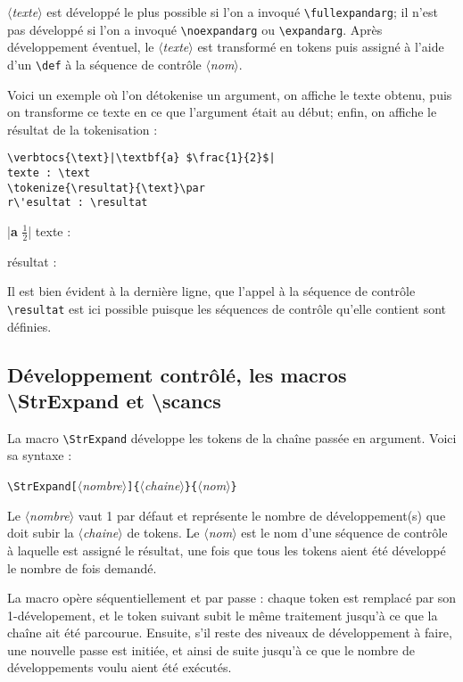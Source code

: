 \documentclass[a4paper,10pt]{article}
\newcommand\argu[1]{$\langle$\textit{#1}$\rangle$}
\newcommand\ARGU[1]{\texttt{\color{black}\{}\argu{#1}\texttt{\color{black}\}}}
\newcommand\arguC[1]{\texttt{\color{black}[}\argu{#1}\texttt{\color{black}]}}
\newcommand\styleexercice{\footnotesize}
\newcommand\verbinline{\lstinline[basicstyle=\normalsize\ttfamily]}
\begin{document}
\argu{texte} est développé le plus possible si l'on a invoqué \verbinline|\fullexpandarg|; il n'est pas développé si l'on a invoqué \verbinline|\noexpandarg| ou \verbinline|\expandarg|. Après développement éventuel, le \argu{texte} est transformé en tokens puis assigné à l'aide d'un \verb|\def| à la séquence de contrôle \argu{nom}.\medskip

Voici un exemple où l'on détokenise un argument, on affiche le texte obtenu, puis on transforme ce texte en ce que l'argument était au début; enfin, on affiche le résultat de la tokenisation :\par\nobreak\medskip
\begin{minipage}[c]{0.65\linewidth}
\begin{lstlisting}
\verbtocs{\text}|\textbf{a} $\frac{1}{2}$|
texte : \text
\tokenize{\resultat}{\text}\par
r\'esultat : \resultat
\end{lstlisting}%
\end{minipage}\hfill
\begin{minipage}[c]{0.35\linewidth}
	\styleexercice
	\verbtocs{\text}|\textbf{a} $\frac{1}{2}$|
	texte : \text
	\tokenize{\resultat}{\text}	\par
	r\'esultat : \resultat
\end{minipage}%
\medskip

Il est bien évident à la dernière ligne, que l'appel à la séquence de contrôle \verb|\resultat| est ici possible puisque les séquences de contrôle qu'elle contient sont définies.\medskip

\subsection{Développement contrôlé, les macros  {\ttfamily\textbackslash StrExpand} et {\ttfamily\textbackslash scancs}}
\label{scancs}
La macro \verbinline|\StrExpand| développe les tokens de la chaîne passée en argument. Voici sa syntaxe :\par\nobreak\medskip
\verbinline|\StrExpand|\arguC{nombre}\ARGU{chaine}\ARGU{nom}\smallskip

Le \argu{nombre} vaut 1 par défaut et représente le nombre de développement(s) que doit subir la \argu{chaine} de tokens. Le \argu{nom} est le nom d'une séquence de contrôle à laquelle est assigné le résultat, une fois que tous les tokens aient été développé le nombre de fois demandé.\medskip

La macro opère séquentiellement et par passe : chaque token est remplacé par son 1-dévelopement, et le token suivant subit le même traitement jusqu'à ce que la chaîne ait été parcourue. Ensuite, s'il reste des niveaux de développement à faire, une nouvelle passe est initiée, et ainsi de suite jusqu'à ce que le nombre de développements voulu aient été exécutés.\medskip
\end{document}
